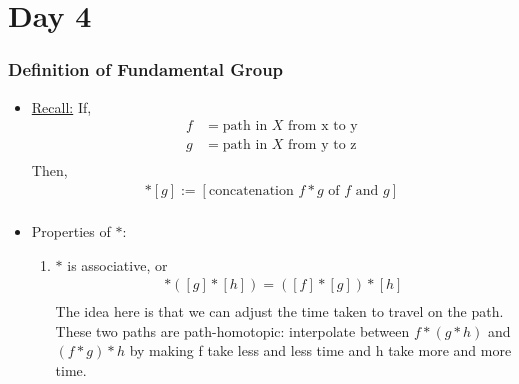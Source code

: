 \documentclass[../notes.tex]{subfiles}
\begin{document}
\section{Day 4}
    \subsubsection{Definition of Fundamental Group}
    \begin{itemize}
        \item \underline{Recall:} If,
            \begin{align*}
                f&=\text{path in $X$ from x to y}\\
                g&=\text{path in $X$ from y to z}\\
            \end{align*}
            Then,
            \begin{align*}
                [f]*[g]:=[\text{concatenation $f*g$ of $f$ and $g$}]\\
            \end{align*}
        \item{Properties of $*$:}
            \begin{enumerate}
                \item $*$ is associative, or
                    \begin{align*}
                        [f]*([g]*[h])=([f]*[g])*[h]\\
                    \end{align*}
                    The idea here is that we can adjust the time taken to travel on the path.
                    These two paths are path-homotopic: interpolate between $f*(g*h)$ and
                    $(f*g)*h$ by making f take less and less time and h take more and more time.\\
            \begin{minipage}[c]{\linewidth}
                \begin{center}
\end{center}
\end{minipage}
\end{enumerate}
\end{itemize}
\end{document}
